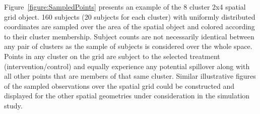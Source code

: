 \documentclass{article}[11pt]
\begin{document}







Figure~\ref{figure:SampledPoints} presents an example of the 8 cluster 2x4 spatial grid object. 160 subjects (20 subjects for each cluster) with uniformly distributed coordinates are sampled over the area of the spatial object and colored according to their cluster membership. Subject counts are not necessarily identical between any pair of clusters as the sample of subjects is considered over the whole space. Points in any cluster on the grid are subject to the selected treatment (intervention/control) and equally experience any potential spillover along with all other points that are members of that same cluster. Similar illustrative figures of the sampled observations over the spatial grid could be constructed and displayed for the other spatial geometries under consideration in the simulation study.
\end{document}
